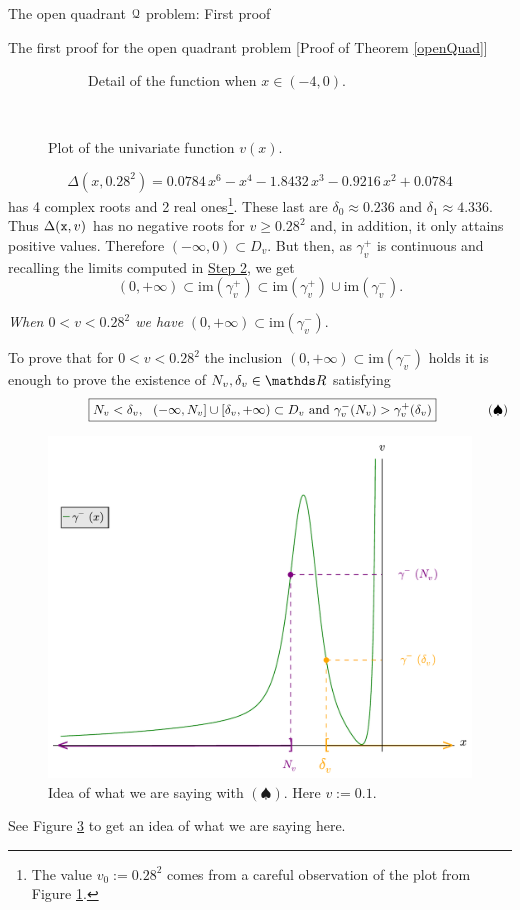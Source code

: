 \documentclass[11pt, a4paper, english, twoside, notitlepage, openright]{report}
\begin{document}
\begin{chapter}{The open quadrant $\mathcal{Q}$ problem: First proof}
\begin{section}{The first proof for the open quadrant problem} [Proof of Theorem \ref{openQuad}]
\begin{figure}[h]
\begin{subfigure}{.5\linewidth}
\caption{Detail of the function when $x\in(-4,0)$.\label{fig:uveDetail}}
\end{subfigure}\\[1ex]
\caption{Plot of the univariate function $v(x)$.\label{fig:v(x)}}
\end{figure}
$$
\Delta(x,0.28^2)=0.0784\,x^{6}-x^{4}-1.8432\,x^{3}-0.9216\,x^{2}+0.0784
$$ 
has 4 complex roots and 2 real ones\footnote{The value $v_0:=0.28^2$ comes from a careful observation of the plot from Figure \ref{fig:uveDetail}.}. These last are $\delta_0\approx 0.236$ and $\delta_1\approx 4.336$. Thus $\Delta({\tt x},v)$ has no negative roots for $v\ge 0.28^2$ and, in addition, it only attains positive values. Therefore $(-\infty,0)\subset D_v$. But then, as $\gamma_v^+$ is continuous and recalling the limits computed in \hyperref[step2]{Step 2}, we get  
$$
(0,+\infty)\subset\text{im}(\gamma_v^+)\subset\text{im}(\gamma_v^+)\cup\text{im}(\gamma_v^-).
$$
\begin{center}
 \emph{When $0<v<0.28^2$ we have} $(0,+\infty)\subset\text{im}(\gamma_v^-)$.
\end{center}
\label{step4}
To prove that for $0<v<0.28^2$ the inclusion $(0,+\infty)\subset\text{im}(\gamma_v^-)$ holds it is enough to prove the existence of $N_v,\delta_v\in\R$ satisfying			
\begin{equation*}\qquad \quad
\qquad\quad\boxed{N_v<\delta_v,\ \ (-\infty,N_v]\cup[\delta_v,+\infty)\subset D_v\text{ and } \gamma_v^-(N_v)>\gamma_v^+(\delta_v)\\
}\qquad \qquad (\spadesuit)
\end{equation*}
\begin{figure}[h]
\centering
\includegraphics[width=1\textwidth]{plots/ch1_12_idea.pdf}
\caption{Idea of what we are saying with $(\spadesuit)$. Here $v:=0.1$.\label{fig:idea}}
\end{figure}
See Figure \ref{fig:idea} to get an idea of what we are saying here. 


\end{section}
\end{chapter}
\end{document}
